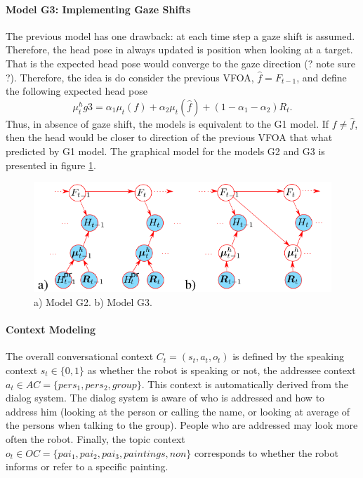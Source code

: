 \documentclass[11pt,a4paper]{article}
\begin{document}
\paragraph{Model G3: Implementing Gaze Shifts}
The previous model has one drawback: at each time step a gaze shift is assumed. Therefore, the head pose in always updated is position when looking at a target. That is the expected head pose would converge to the gaze direction (? note sure ?). Therefore, the idea is do consider the previous VFOA, $\hat{f} = F_{t-1}$, and define the following expected head pose
\begin{equation}
\mu_t^hg3 = \alpha_1 \mu_t(f) + \alpha_2 \mu_t(\hat{f}) + (1-\alpha_1-\alpha_2)R_t.
\end{equation}
Thus, in absence of gaze shift, the models is equivalent to the G1 model. If $f \neq \hat{f}$, then the head would be closer to direction of the previous VFOA that what predicted by G1 model. The graphical model for the models G2 and G3 is presented in figure \ref{ModelG2G3}.

\begin{figure}[!h]
\centering
\includegraphics[scale = 0.5]{./Pictures/HMM_ModelG2G3.png}
\caption{a) Model G2. b) Model G3. \label{ModelG2G3}}
\end{figure}

\paragraph{Context Modeling}
The overall conversational context $C_t = (s_t,a_t,o_t)$ is defined by the speaking context $s_t \in \{0,1\}$ as whether the robot is speaking or not, the addressee context $a_t \in AC = \{pers_1,pers_2,group\}$. This context is automatically derived from the dialog system. The dialog system is aware of who is addressed and how to address him (looking at the person or calling the name, or looking at average of the persons when talking to the group). People who are addressed may look more often the robot. Finally, the topic context $o_t \in OC = \{pai_1, pai_2,pai_3,paintings,non\}$ corresponds to whether the robot informs or refer to a specific painting.
\end{document}
